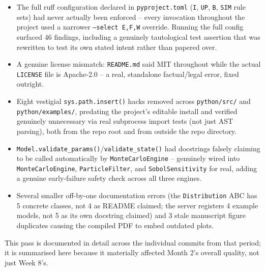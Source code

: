 \documentclass[11pt]{article}
\begin{document}
\begin{itemize}[leftmargin=*]
\begin{itemize}
        it going forward.
      \item The full ruff configuration declared in
        \texttt{pyproject.toml} (\texttt{I}, \texttt{UP}, \texttt{B},
        \texttt{SIM} rule sets) had never actually been enforced --
        every invocation throughout the project used a narrower
        \texttt{--select E,F,W} override. Running the full config
        surfaced 46 findings, including a genuinely tautological test
        assertion that was rewritten to test its own stated intent
        rather than papered over.
      \item A genuine license mismatch: \texttt{README.md} said MIT
        throughout while the actual \texttt{LICENSE} file is
        Apache-2.0 -- a real, standalone factual/legal error, fixed
        outright.
      \item Eight vestigial \texttt{sys.path.insert()} hacks removed
        across \texttt{python/src/} and \texttt{python/examples/},
        predating the project's editable install and verified
        genuinely unnecessary via real subprocess import tests (not
        just AST parsing), both from the repo root and from outside
        the repo directory.
      \item \texttt{Model.validate\_params()}/\texttt{validate\_state()}
        had docstrings falsely claiming to be called automatically by
        \texttt{MonteCarloEngine} -- genuinely wired into
        \texttt{MonteCarloEngine}, \texttt{ParticleFilter}, and
        \texttt{SobolSensitivity} for real, adding a genuine
        early-failure safety check across all three engines.
      \item Several smaller off-by-one documentation errors (the
        \texttt{Distribution} ABC has 5 concrete classes, not 4 as
        README claimed; the server registers 4 example models, not 5
        as its own docstring claimed) and 3 stale manuscript figure
        duplicates causing the compiled PDF to embed outdated plots.
    \end{itemize}
    This pass is documented in detail across the individual commits
    from that period; it is summarised here because it materially
    affected Month 2's overall quality, not just Week 8's.
\end{itemize}
\end{document}

